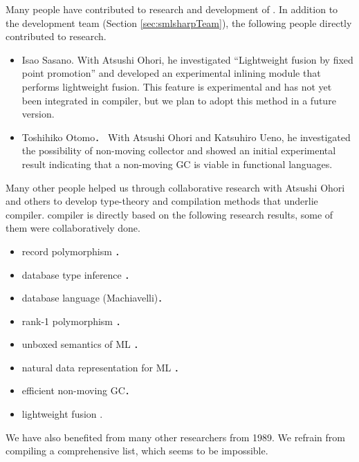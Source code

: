 	Many people have contributed to research and development of
\smlsharp{}.
	In addition to the development team (Section
\ref{sec:smlsharpTeam}), the following people directly contributed to 
\smlsharp{} research.
\begin{itemize}
\item Isao Sasano.
With Atsushi Ohori, he investigated 
``Lightweight fusion by fixed point promotion'' and 
developed an experimental inlining module that performs lightweight
fusion.
	This feature is experimental and has not yet been integrated in
\smlsharp{} compiler, but we plan to adopt this method in a future
version.
\item Toshihiko Otomo．
	With Atsushi Ohori and Katsuhiro Ueno, he investigated the
possibility of non-moving collector and showed an initial experimental
result indicating that a non-moving GC is viable in functional
languages.
\end{itemize}
	Many other people helped us through collaborative research with
Atsushi Ohori and others to develop type-theory and compilation methods
that underlie \smlsharp{} compiler.
	\smlsharp{} compiler is directly based on the
following research results, some of them were collaboratively done.
\begin{itemize}
\item record polymorphism \cite{ohor92popl,ohor95toplas}．
\item database type inference \cite{ohor88lfp}．
\item database language (Machiavelli)\cite{ohor89sigmod,bune96tods}．
\item rank-1 polymorphism \cite{ohor99icfp}．
\item unboxed semantics of ML \cite{ohor97unbox}．
\item natural data representation for ML \cite{nguyen06ppdp}．
\item efficient non-moving GC\cite{ueno11icfp}．
\item lightweight fusion \cite{ohor07popl}.
\end{itemize}
	We have also benefited from many other researchers from 1989.
	We refrain from compiling a comprehensive list, which seems to
be impossible. 
\fi%

\section{}
\label{sec:smlsharpLicence}

